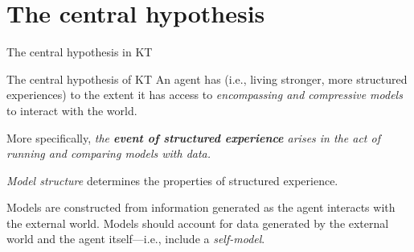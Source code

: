 \section{The central hypothesis}

\begin{frame}[label=ladila]{The central hypothesis in KT}

\begin{exampleblock}{The central hypothesis of KT}
An agent has \SEP (i.e., living stronger, more structured experiences) to the extent it has access to {\em encompassing and compressive models}  to interact with the world.  

\vspace{0.5cm}

More specifically,  {\em the \textbf{event of structured experience} arises in the act of running and comparing models with data.}
\vspace{0.5cm}

\textit{Model structure} determines the properties of structured experience. \vspace{0.5cm}

\end{exampleblock}
 \vfill
   Models are constructed from information generated as the agent interacts with the external world. Models should account for data generated by the external world and the agent itself---i.e., include a {\em self-model}.

 

\end{frame}





 
    
    
    
 


